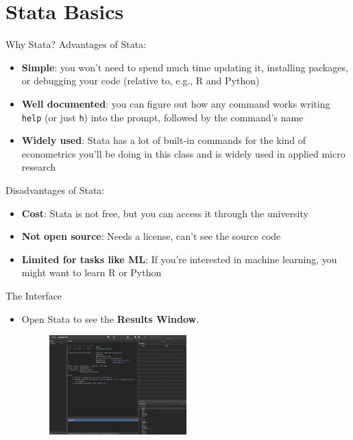 \documentclass[11pt,notes=hide,aspectratio=169,mathserif]{beamer}
\begin{document}
\section{Stata Basics}
\begin{frame}{Why Stata?}
Advantages of Stata: 
    \begin{itemize}
        \item \textbf{Simple}: you won't need to spend much time updating it, installing packages, or debugging your code (relative to, e.g., R and Python) 
        \item \textbf{Well documented}: you can figure out how any command works writing \texttt{help} (or just \texttt{h}) into the prompt, followed by the command's name
        \item \textbf{Widely used}: Stata has a lot of built-in commands for the kind of econometrics you'll be doing in this class and is widely used in applied micro research
    \end{itemize}
\vspace{3mm}    
Disadvantages of Stata: 
    \begin{itemize}
        \item \textbf{Cost}: Stata is not free, but you can access it through the university
        \item \textbf{Not open source}: Needs a license, can't see the source code 
        \item \textbf{Limited for tasks like ML}: If you're interested in machine learning, you might want to learn R or Python
    \end{itemize}
\end{frame}

\begin{frame}{The Interface}
    \begin{itemize}
    \item Open Stata to see the \textbf{Results Window}.
        \begin{figure}
            \centering
            \includegraphics[width=0.5\textwidth]{inputs/ta1_result_window1.png}
        \end{figure}
    \end{itemize}
\end{frame}
\end{document}
